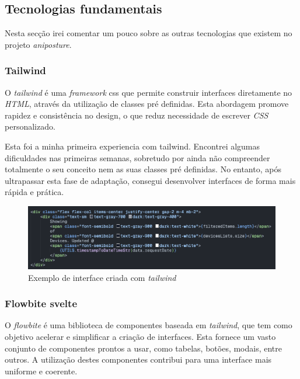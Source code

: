 \clearpage
\subsection{Tecnologias fundamentais}\label{sec:tec_fund_ani}

Nesta secção irei comentar um pouco sobre as outras tecnologias que existem no projeto \textit{aniposture}. 

\subsubsection{\textbf{Tailwind}}
O \textit{tailwind} é uma \textit{framework} css que permite construir interfaces diretamente no \textit{HTML}, através da utilização de classes pré definidas. Esta abordagem promove rapidez e consistência no design, o que reduz necessidade de escrever \textit{CSS} personalizado.

Esta foi a minha primeira experiencia com tailwind. Encontrei algumas dificuldades nas primeiras semanas, sobretudo por ainda não compreender totalmente o seu conceito nem as suas classes pré definidas. No entanto, após ultrapassar esta fase de adaptação, consegui desenvolver interfaces de forma mais rápida e prática.

\begin{figure}[h!]
    \centering
    \includegraphics[width=\textwidth]{figs/tailwind.png}
    \caption{Exemplo de interface criada com \textit{tailwind}}
    \label{fig:tailwind}
\end{figure}

\subsubsection{\textbf{Flowbite svelte}}
O \textit{flowbite} é uma biblioteca de componentes baseada em \textit{tailwind}, que tem como objetivo acelerar e simplificar a criação de interfaces. Esta fornece um vasto conjunto de componentes prontos a usar, como tabelas, botões, modais, entre outros. A utilização destes componentes contribui para uma interface mais uniforme e coerente.

